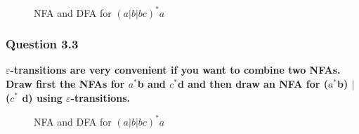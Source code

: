             \begin{figure}%
                \centering
                \qquad
                \caption{NFA and DFA for $(a|b|bc)^{*}a$}%
                \label{fig:example}%
            \end{figure}
           

        \subsubsection{Question 3.3}
            \textbf{$\varepsilon$-transitions are very convenient if you want to combine two NFAs. Draw first the NFAs for $a^{*}$b and $c^{*}$d and then draw an NFA for ($a^{*}$b) $|$ ($c^{*}$ d) using $\varepsilon$-transitions.}

              \begin{figure}%
                \centering
                \qquad
                \caption{NFA and DFA for $(a|b|bc)^{*}a$}%
                \label{fig:example}%
            \end{figure}

